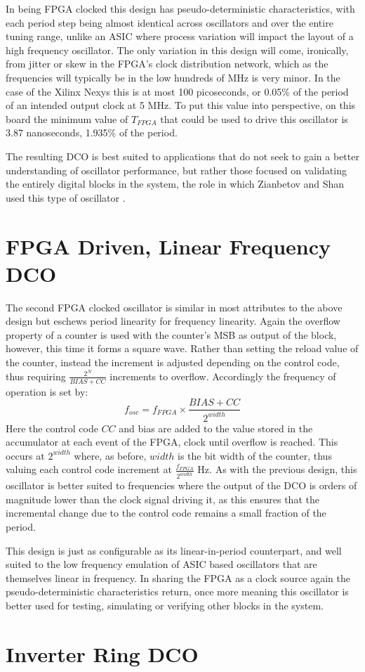 In being \ac{FPGA} clocked this design has pseudo-deterministic characteristics, with each period step being almost identical across oscillators and over the entire tuning range, unlike an \ac{ASIC} where process variation will impact the layout of a high frequency oscillator. The only variation in this design will come, ironically, from jitter or skew in the \ac{FPGA}'s clock distribution network, which as the frequencies will typically be in the low hundreds of MHz is very minor. In the case of the Xilinx \acl{Nexys} this is at most 100 picoseconds, or 0.05\% of the period of an intended output clock at 5 MHz. To put this value into perspective, on this board the minimum value of $T_{FPGA}$ that could be used to drive this oscillator is 3.87 nanoseconds, 1.935\% of the period.

The resulting \ac{DCO} is best suited to applications that do not seek to gain a better understanding of oscillator performance, but rather those focused on validating the entirely digital blocks in the system, the role in which Zianbetov and Shan used this type of oscillator \cite{zianbetov2013phd,shan2014phd}.

\section{\acs{FPGA} Driven, Linear Frequency \acs{DCO}}
The second \ac{FPGA} clocked oscillator is similar in most attributes to the above design but eschews period linearity for frequency linearity. Again the overflow property of a counter is used with the counter's \ac{MSB} as output of the block, however, this time it forms a square wave. Rather than setting the reload value of the counter, instead the increment is adjusted depending on the control code, thus requiring $\frac{2^N}{BIAS+CC}$ increments to overflow. Accordingly the frequency of operation is set by:
\begin{equation}
	f_{osc} = f_{FPGA}\times\frac{BIAS+CC}{2^{width}}
\end{equation}
Here the control code $CC$ and bias are added to the value stored in the accumulator at each event of the \ac{FPGA}, clock until overflow is reached. This occurs at $2^{width}$ where, as before, $width$ is the bit width of the counter, thus valuing each control code increment at $\frac{f_{FPGA}}{2^{width}}$ Hz. As with the previous design, this oscillator is better suited to frequencies where the output of the \ac{DCO} is orders of magnitude lower than the clock signal driving it, as this ensures that the incremental change due to the control code remains a small fraction of the period.

This design is just as configurable as its linear-in-period counterpart, and well suited to the low frequency emulation of \ac{ASIC} based oscillators that are themselves linear in frequency. In sharing the \ac{FPGA} as a clock source again the pseudo-deterministic characteristics return, once more meaning this oscillator is better used for testing, simulating or verifying other blocks in the system.

\section{Inverter Ring \acs{DCO}}


